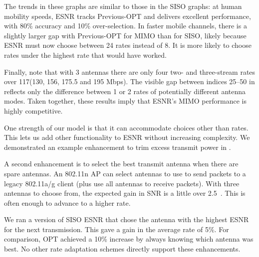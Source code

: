 The trends in these graphs are similar to those in the SISO graphs: at human mobility speeds, ESNR tracks Previous-OPT and delivers excellent performance, with 80\% accuracy and 10\% over-selection. In faster mobile channels, there is a slightly larger gap with Previous-OPT for MIMO than for SISO, likely because ESNR must now choose between 24 rates instead of 8. It is more likely to choose rates under the highest rate that would have worked. 

Finally, note that with 3 antennas there are only four two- and three-stream rates over 117\Mbps (130, 156, 175.5 and 195 Mbps). The visible gap between indices 25--50 in  reflects only the difference between 1 or 2 rates of potentially different antenna modes. Taken together, these results imply that ESNR's MIMO performance is highly competitive.


One strength of our model is that it can accommodate choices other than rates. This lets us add other functionality to ESNR without increasing complexity. We demonstrated an example enhancement to trim excess transmit power in .

A second enhancement is to select the best transmit antenna when there are spare antennas. %
An 802.11n AP can select antennas to use to send packets to a legacy 802.11a/g client (plus use all antennas to receive packets). With three antennas to choose from, the expected gain in SNR is a little over 2.5\dB~\cite{Goldsmith}. This is often enough to advance to a higher rate.

We ran a version of SISO ESNR that chose the antenna with the highest ESNR for the next transmission. This gave a gain in the average rate of 5\%.  For comparison, OPT achieved a 10\% increase by always knowing which antenna was best. No other rate adaptation schemes directly support these enhancements.

\ifx\mainfile\undefined

\fi
